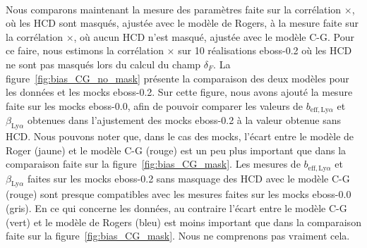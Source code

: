 \documentclass[11pt, twoside, a4paper, openright]{report}
\begin{document}
\paragraph{}
Nous comparons maintenant la mesure des paramètres \lya{} faite sur la corrélation \lya{}$\times$\lya{}, où les HCD sont masqués, ajustée avec le modèle de Rogers, à la mesure faite sur la corrélation \lya{}$\times$\lya{}, où aucun HCD n'est masqué, ajustée avec le modèle C-G.
Pour ce faire, nous estimons la corrélation \lya{}$\times$\lya{} sur \num{10} réalisations eboss-0.2 où les HCD ne sont pas masqués lors du calcul du champ $\delta_F$.
La figure~\ref{fig:bias_CG_no_mask} présente la comparaison des deux modèles pour les données et les mocks eboss-0.2.
Sur cette figure, nous avons ajouté la mesure faite sur les mocks eboss-0.0, afin de pouvoir comparer les valeurs de $b_{\mathrm{eff},\mathrm{Ly}\alpha}$ et  $\beta_{\mathrm{Ly}\alpha}$ obtenues dans l'ajustement des mocks eboss-0.2 à la valeur obtenue sans HCD.
Nous pouvons noter que, dans le cas des mocks, l'écart entre le modèle de Roger (jaune) et le modèle C-G (rouge) est un peu plus important que dans la comparaison faite sur la figure~\ref{fig:bias_CG_mask}.
Les mesures de $b_{\mathrm{eff},\mathrm{Ly}\alpha}$ et  $\beta_{\mathrm{Ly}\alpha}$ faites sur les mocks eboss-0.2 sans masquage des HCD avec le modèle C-G (rouge) sont presque compatibles avec les mesures faites sur les mocks eboss-0.0 (gris).
En ce qui concerne les données, au contraire l'écart entre le modèle C-G (vert) et le modèle de Rogers (bleu) est moins important que dans la comparaison faite sur la figure~\ref{fig:bias_CG_mask}. Nous ne comprenons pas vraiment cela.
\end{document}
